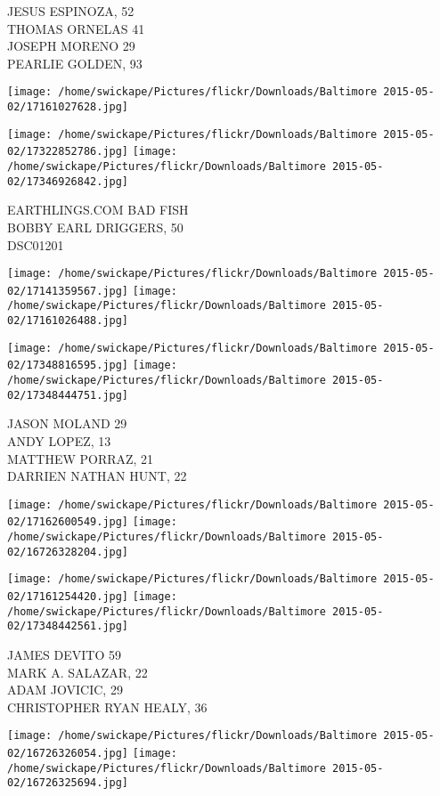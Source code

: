 \documentclass[10pt,letterpaper]{article}
\begin{document}
JESUS ESPINOZA, 52\\
THOMAS ORNELAS 41\\
JOSEPH MORENO 29\\
PEARLIE GOLDEN, 93
\pagebreak

\texttt{[image: /home/swickape/Pictures/flickr/Downloads/Baltimore 2015-05-02/17161027628.jpg]}

\vspace{0.25in}
\texttt{[image: /home/swickape/Pictures/flickr/Downloads/Baltimore 2015-05-02/17322852786.jpg]}
\texttt{[image: /home/swickape/Pictures/flickr/Downloads/Baltimore 2015-05-02/17346926842.jpg]}

EARTHLINGS.COM BAD FISH\\
BOBBY EARL DRIGGERS, 50\\
DSC01201
\pagebreak

\texttt{[image: /home/swickape/Pictures/flickr/Downloads/Baltimore 2015-05-02/17141359567.jpg]}
\texttt{[image: /home/swickape/Pictures/flickr/Downloads/Baltimore 2015-05-02/17161026488.jpg]}

\texttt{[image: /home/swickape/Pictures/flickr/Downloads/Baltimore 2015-05-02/17348816595.jpg]}
\texttt{[image: /home/swickape/Pictures/flickr/Downloads/Baltimore 2015-05-02/17348444751.jpg]}

JASON MOLAND 29\\
ANDY LOPEZ, 13\\
MATTHEW PORRAZ, 21\\
DARRIEN NATHAN HUNT, 22
\pagebreak

\texttt{[image: /home/swickape/Pictures/flickr/Downloads/Baltimore 2015-05-02/17162600549.jpg]}
\texttt{[image: /home/swickape/Pictures/flickr/Downloads/Baltimore 2015-05-02/16726328204.jpg]}

\texttt{[image: /home/swickape/Pictures/flickr/Downloads/Baltimore 2015-05-02/17161254420.jpg]}
\texttt{[image: /home/swickape/Pictures/flickr/Downloads/Baltimore 2015-05-02/17348442561.jpg]}

JAMES DEVITO 59\\
MARK A. SALAZAR, 22\\
ADAM JOVICIC, 29\\
CHRISTOPHER RYAN HEALY, 36
\pagebreak

\texttt{[image: /home/swickape/Pictures/flickr/Downloads/Baltimore 2015-05-02/16726326054.jpg]}
\texttt{[image: /home/swickape/Pictures/flickr/Downloads/Baltimore 2015-05-02/16726325694.jpg]}
\end{document}
